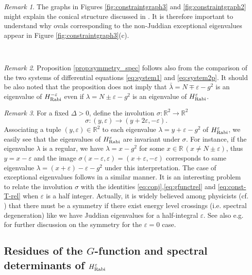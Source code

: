 \documentclass[11pt]{article}
\numberwithin{equation}{section}
\newcommand{\R}{\mathbb{R}} %
\newcommand{\e}{\varepsilon}
\newcommand{\HRabi}[1]{H_{\text{\upshape Rabi}}^{#1}} %
\theoremstyle{plain}
\theoremstyle{definition}
\theoremstyle{remark}
\newtheorem{rem}{Remark}[section]
\begin{document}
\begin{rem}
The graphs in Figures \ref{fig:constraintgraph3} and \ref{fig:constraintgraph2} might explain the conical structure discussed in \cite{BLZ2015JPALetter}. It is therefore important to understand why ovals corresponding to the non-Juddian exceptional eigenvalues appear in Figure \ref{fig:constraintgraph3}(c).
\end{rem}
\,

\begin{rem}\label{rem:symmetry_spec}
  Proposition \ref{prop:symmetry_spec}  follows also from the comparison of the two systems of differential equations \eqref{eq:system1}
  and \eqref{eq:system2p}.
  It should be also noted that the proposition does not imply that  $\bar{\lambda} = N\mp\e -g^2$ is an eigenvalue of \(\HRabi{-\e} \) even if $\lambda = N\pm\e -g^2$ is  an eigenvalue of $\HRabi{\e}$.
\end{rem}


\begin{rem}
  For a fixed \(\Delta >0 \), define the involution \(\sigma : \R^2  \to \R^2 \)
  \begin{equation*}
    \sigma : (y, \e) \to (y+2\e,-\e).
  \end{equation*}
  Associating a tuple \((y,\e) \in \R^2\) to each eigenvalue \( \lambda = y + \e -g^2  \) of $\HRabi{\e}$, we easily see that
  the eigenvalues of \(\HRabi{\e} \) are invariant under \(\sigma\). For instance, if the eigenvalue \(\lambda\) is a regular, we have
  \(\lambda = x - g^2 \) for some \(x \in \R \, (x \not= N \pm  \e) \), thus \(y = x - \e \) and the image  \(\sigma(x-\e,\e) =  (x+\e,-\e)\)
  corresponds to same eigenvalue \( \lambda = (x+\e)-\e -g^2\) under this interpretation. The case of exceptional eigenvalues follows in a
  similar manner. It is an interesting problem to relate the involution \(\sigma\) with the identities \eqref{eq:conj},\eqref{eq:gfunctrel} and
  \eqref{eq:const-T-rel} when $\e$ is a half integer. Actually, it is widely believed among physicists (cf. \cite{AW_personal2017})
  that there must be a symmetry if there exist energy level crossings (i.e. spectral degeneration) like we have Juddian eigenvalues for
  a half-integral $\e$. See also e.g. \cite{GD2013JPA} for further discussion on the symmetry for the \(\e=0\) case.
\end{rem}


\subsection{Residues of the \texorpdfstring{$G$}{G}-function and spectral determinants of \texorpdfstring{$\HRabi{\e}$}{H}} \label{sec:SpectralDet}
\end{document}
